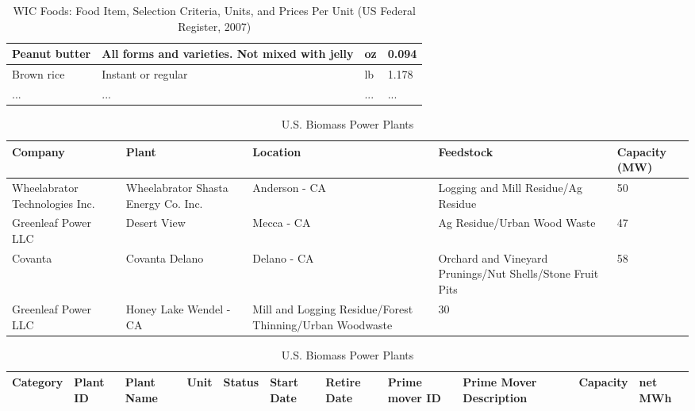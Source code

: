 \begin{itemize}
\begin{table*}[!ht]
\begin{tabular}{ |l|p{8cm}|l|p{4cm}|  }
			Peanut butter& 	All forms and varieties. Not mixed with jelly& 	oz& 	0.094\\\hline
			Brown rice& 	Instant or regular& 	lb& 	1.178\\\hline
			...& 	...& 	...& 	...\\
			\hline
			
		\end{tabular}
		\vspace{.2cm}
		\caption{WIC Foods: Food Item, Selection Criteria, Units, and Prices Per Unit (US Federal Register, 2007) \label{tab:q1-result2}}
	\end{table*}
\fi

\begin{table*}[!ht]
	\setlength\extrarowheight{2pt} %
	\begin{tabular}{ |l|p{2cm}|p{3cm}|p{2cm}|l|  }
		\hline
		\textbf{Company}&	\textbf{Plant}&	\textbf{Location}&	\textbf{Feedstock}&	\textbf{Capacity (MW)}\\
		\hline
		Wheelabrator Technologies Inc.& 	Wheelabrator Shasta Energy Co. Inc.& 	Anderson - CA& 	Logging and Mill Residue/Ag Residue& 	50\\
		\hline
		Greenleaf Power LLC& 	Desert View& 	Mecca - CA& 	Ag Residue/Urban Wood Waste& 	47\\
		\hline
		Covanta& 	Covanta Delano& 	Delano - CA& 	Orchard and Vineyard Prunings/Nut Shells/Stone Fruit Pits& 	58\\
		\hline
		Greenleaf Power LLC& 	Honey Lake 	Wendel - CA&	Mill and Logging Residue/Forest Thinning/Urban Woodwaste& 	30\\
		\hline
		
	\end{tabular}
	\vspace{.2cm}
	\caption{U.S. Biomass Power Plants\label{tab:q1-result1}}
\end{table*}
	

\begin{table*}[!ht]
	\setlength\extrarowheight{2pt} %
	\begin{tabular}{ |l|p{1cm}|p{2cm}|p{1cm}|l|p{1cm}|p{2cm}|p{2cm}|p{2cm}|p{1cm}|p{1cm}|  }
		\hline
		Category& 	Plant ID& 	Plant Name& 	Unit& 	Status& 	Start Date& 	Retire Date& 	Prime mover ID& Prime Mover Description& Capacity& net MWh\\
		\hline
		
		
	\end{tabular}
	\vspace{.2cm}
	\caption{U.S. Biomass Power Plants\label{tab:q1-result1}}
\end{table*}

\end{itemize}
